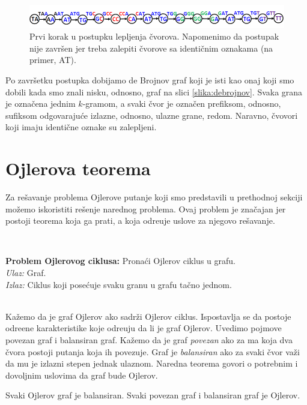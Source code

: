 \begin{figure}[h]
	\centering
	\includegraphics[width=1\textwidth]{poglavlja/3/slike/lepljenje.png}
	\caption{Prvi korak u postupku lepljenja čvorova. Napomenimo da postupak nije završen jer treba zalepiti čvorove sa identičnim oznakama (na primer, AT).}
	\label{slika:lepljenje}
\end{figure} 

Po završetku postupka dobijamo de Brojnov graf koji je isti kao onaj koji smo dobili kada smo znali nisku, odnosno, graf na slici \ref{slika:debrojnov}. Svaka grana je označena jednim $k$-gramom, a svaki čvor je označen prefiksom, odnosno, sufiksom odgovaraju\'ce izlazne, odnosno, ulazne grane, redom. Naravno, \v cvovori koji imaju identi\v cne oznake su zalepljeni.

\section{Ojlerova teorema}

Za re\v savanje problema Ojlerove putanje koji smo predstavili u prethodnoj sekciji mo\v zemo iskoristiti re\v senje narednog problema. Ovaj problem je zna\v cajan jer postoji teorema koja ga prati, a koja odre\dj uje uslove za njegovo re\v savanje.

~ \\
\begin{tcolorbox}
	\textbf{Problem Ojlerovog ciklusa:} Pronaći Ojlerov ciklus u grafu. \\
	\textit{Ulaz:} Graf.\\
	\textit{Izlaz:} Ciklus koji posećuje svaku granu u grafu tačno jednom.
\end{tcolorbox}

~\\


Ka\v zemo da je graf Ojlerov ako sadr\v zi Ojlerov ciklus. Ispostavlja se da postoje odre\dj ene karakteristike koje odre\dj uju da li je graf Ojlerov. Uvedimo pojmove povezan graf i balansiran graf. Kažemo da je graf \emph{povezan} ako za ma koja dva čvora postoji putanja koja ih povezuje. Graf je \emph{balansiran} ako za svaki čvor važi da mu je izlazni stepen jednak ulaznom. Naredna teorema govori o potrebnim i dovoljnim uslovima da graf bude Ojlerov.

\begin{teorema}
	Svaki Ojlerov graf je balansiran. Svaki povezan graf i balansiran graf je Ojlerov.
\end{teorema}

